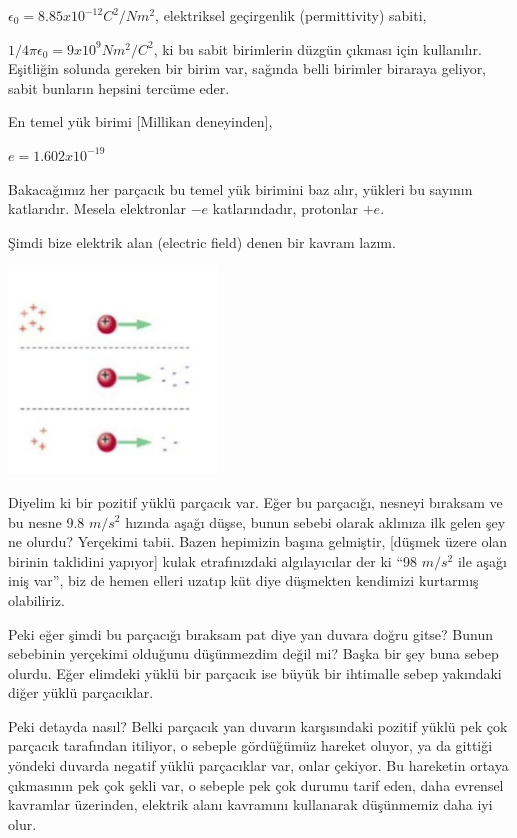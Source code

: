 \documentclass[12pt,fleqn]{article}\usepackage{../../common}
\begin{document}
$ \epsilon_0 = 8.85 x 10^{-12} C^2/N m^2 $, elektriksel geçirgenlik
(permittivity) sabiti,

$ 1/4\pi \epsilon_0 = 9 x 10^9 N m^2 /C^2$, ki bu sabit birimlerin düzgün
çıkması için kullanılır. Eşitliğin solunda gereken bir birim var, sağında
belli birimler biraraya geliyor, sabit bunların hepsini tercüme eder.

En temel yük birimi [Millikan deneyinden], 

$ e = 1.602 x 10^{-19}$

Bakacağımız her parçacık bu temel yük birimini baz alır, yükleri bu sayının
katlarıdır. Mesela elektronlar $-e$ katlarındadır, protonlar $+e$.

Şimdi bize elektrik alan (electric field) denen bir kavram lazım. 

\includegraphics[width=15em]{elecmag_04.png}

Diyelim ki bir pozitif yüklü parçacık var. Eğer bu parçacığı, nesneyi
bıraksam ve bu nesne 9.8 $m/s^2$ hızında aşağı düşse, bunun sebebi olarak
aklınıza ilk gelen şey ne olurdu? Yerçekimi tabii. Bazen hepimizin başına
gelmiştir, [düşmek üzere olan birinin taklidini yapıyor] kulak
etrafınızdaki algılayıcılar der ki ``98 $m/s^2$ ile aşağı iniş var'', biz
de hemen elleri uzatıp küt diye düşmekten kendimizi kurtarmış olabiliriz.

Peki eğer şimdi bu parçacığı bıraksam pat diye yan duvara doğru gitse?
Bunun sebebinin yerçekimi olduğunu düşünmezdim değil mi? Başka bir şey buna
sebep olurdu. Eğer elimdeki yüklü bir parçacık ise büyük bir ihtimalle
sebep yakındaki diğer yüklü parçacıklar.

Peki detayda nasıl? Belki parçacık yan duvarın karşısındaki pozitif yüklü
pek çok parçacık tarafından itiliyor, o sebeple gördüğümüz hareket oluyor,
ya da gittiği yöndeki duvarda negatif yüklü parçacıklar var, onlar
çekiyor. Bu hareketin ortaya çıkmasının pek çok şekli var, o sebeple pek
çok durumu tarif eden, daha evrensel kavramlar üzerinden, elektrik alanı
kavramını kullanarak düşünmemiz daha iyi olur.
\end{document}

